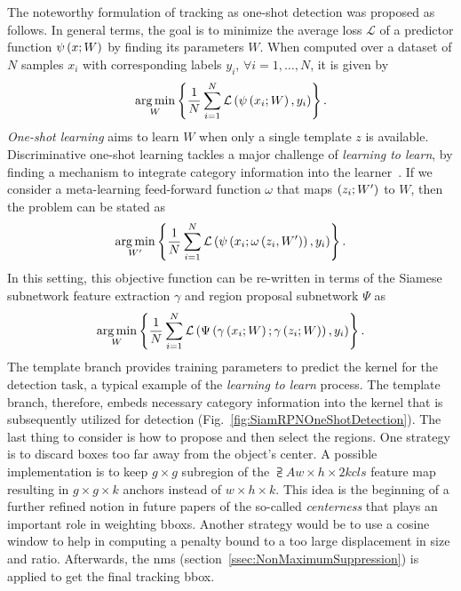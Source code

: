 The noteworthy formulation of tracking as one-shot detection was proposed as follows. In general terms, the goal is to minimize the average loss $\mathcal{L}$ of a predictor function ${\psi} \left( x; W \right)$ by finding its parameters $W$. When computed over a dataset of $N$ samples $x_i$ with corresponding labels $y_i$, $\forall i = 1, \dots, N$, it is given by
\begin{equation}
    \label{eq:SiamRPNOneShotGeneral}
    \underset{W}{\operatorname*{arg\,min}}
    \left\{ {
        \frac{1}{N}
        \sum_{i = 1}^{N}
        {\mathcal{L}} \left( 
            {\psi} \left( x_i; W \right),
            y_i
         \right)
    } \right\}.
\end{equation}
\emph{One-shot learning} aims to learn $W$ when only a single template $z$ is available.
Discriminative one-shot learning tackles a major challenge of \emph{learning to learn}, by finding a mechanism to integrate category information into the learner~\cite{Bertinetto2016OneShot}. If we consider a meta-learning feed-forward function $\omega$ that maps $\left( {z_i; W'} \right)$ to $W$, then the problem can be stated as
\begin{equation}
    \label{eq:SiamRPNOneShotMetaLearning}
    \underset{W'}{\operatorname*{arg\,min}}
    \left\{ {
        \frac{1}{N}
        \sum_{i = 1}^{N}
        {\mathcal{L}} \left( 
            {\psi} \left( x_i; {\omega} \left( z_i, W' \right) \right),
            y_i
         \right)
    } \right\}.
\end{equation}
In this setting, this objective function can be re-written in terms of the Siamese subnetwork feature extraction $\gamma$ and region proposal subnetwork $\Psi$ as
\begin{equation}
    \label{eq:SiamRPNOneShoCombo}
    \underset{W}{\operatorname*{arg\,min}}
    \left\{ {
        \frac{1}{N}
        \sum_{i = 1}^{N}
        {\mathcal{L}} \left( 
            {\Psi} \left( {\gamma} \left( x_i; W \right); {\gamma} \left( z_i; W \right) \right),
            y_i
         \right)
    } \right\}.
\end{equation}
The template branch provides training parameters to predict the kernel for the detection task, a typical example of the \emph{learning to learn} process. The template branch, therefore, embeds necessary category information into the kernel that is subsequently utilized for detection (Fig.~\ref{fig:SiamRPNOneShotDetection}). The last thing to consider is how to propose and then select the regions. One strategy is to discard boxes too far away from the object's center. A possible implementation is to keep $g \times g$ subregion of the $\supsub{A}{w \times h \times 2k}{cls}$ feature map resulting in $g \times g \times k$ anchors instead of $w \times h \times k$. This idea is the beginning of a further refined notion in future papers of the so-called \emph{centerness} that plays an important role in weighting \glspl{bbox}. Another strategy would be to use a cosine window to help in computing a penalty bound to a too large displacement in size and ratio. Afterwards, the \gls{nms} (section~\ref{ssec:NonMaximumSuppression}) is applied to get the final tracking \gls{bbox}.


